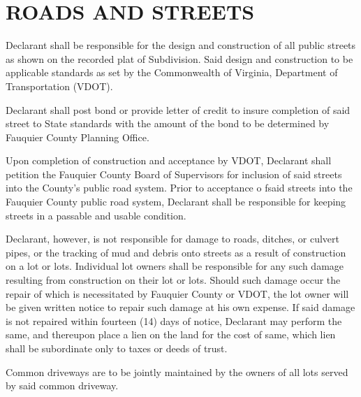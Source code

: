 \documentclass[12pt, letterpaper]{article}
\begin{document}
\section{ROADS AND STREETS}
Declarant shall be responsible for the design and construction of all public streets as shown on the recorded plat of Subdivision.
Said design and construction to be applicable standards as set by the Commonwealth of Virginia, Department of Transportation (VDOT).

Declarant shall post bond or provide letter of credit to insure completion of said street to State standards with the amount of the bond to be determined by Fauquier County Planning Office.

Upon completion of construction and acceptance by VDOT, Declarant shall petition the Fauquier County Board of Supervisors for inclusion of said streets into the County's public road system.
Prior to acceptance o fsaid streets into the Fauquier County public road system, Declarant shall be responsible for keeping streets in a passable and usable condition.

Declarant, however, is not responsible for damage to roads, ditches, or culvert pipes, or the tracking of mud and debris onto streets as a result of construction on a lot or lots.
Individual lot owners shall be responsible for any such damage resulting from construction on their lot or lots.
Should such damage occur the repair of which is necessitated by Fauquier County or VDOT, the lot owner will be given written notice to repair such damage at his own expense.
If said damage is not repaired within fourteen (14) days of notice, Declarant may perform the same, and thereupon place a lien on the land for the cost of same, which lien shall be subordinate only to taxes or deeds of trust.

Common driveways are to be jointly maintained by the owners of all lots served by said common driveway.
\end{document}
